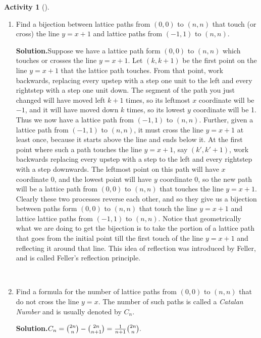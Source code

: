 \documentclass[10pt,]{book}
\theoremstyle{plain}
\theoremstyle{definition}
\newtheorem{activity}[project]{Activity}
\numberwithin{equation}{chapter}
\begin{document}
\begin{activity}[]
\begin{enumerate}[label=(\alph*)]
~\par
\item Find a bijection between lattice paths from \((0,0)\) to \((n,n)\) that touch (or cross) the line \(y=x+1\) and lattice paths from \((-1,1)\) to \((n,n)\).%
\par\medskip\noindent%
\textbf{Solution.}\quad Suppose we have a lattice path form \((0,0)\) to \((n,n)\) which touches or crosses the line \(y=x+1\). Let \((k,k+1)\) be the first point on the line \(y=x+1\) that the lattice path touches. From that point, work backwards, replacing every upstep with a step one unit to the left and every rightstep with a step one unit down. The segment of the path you just changed will have moved left \(k+1\) times, so its leftmost \(x\) coordinate will be \(-1\), and it will have moved down \(k\) times, so its lowest \(y\) coordinate will be 1.  Thus we now have a lattice path from \((-1,1)\) to \((n,n)\). Further, given a lattice path from \((-1,1)\) to \((n,n)\), it must cross the line \(y=x+1\) at least once, because it starts above the line and ends below it. At the first point where such a path touches the line \(y=x+1\), say \((k',k'+1)\), work backwards replacing every upstep with a step to the left and every rightstep with a step downwards. The leftmost point on this path will have \(x\) coordinate 0, and the lowest point will have \(y\) coordinate 0, so the new path will be a lattice path from \((0,0)\) to \((n,n)\) that touches the line \(y=x+1\). Clearly these two processes reverse each other, and so they give us a bijection between paths form \((0,0)\) to \((n,n)\) that touch the line \(y=x+1\) and lattice lattice paths from \((-1,1)\) to \((n,n)\). Notice that geometrically what we are doing to get the bijection is to take the portion of a lattice path that goes from the initial point till the first touch of the line \(y=x+1\) and reflecting it around that line. This idea of reflection was introduced by Feller, and is called Feller's reflection principle.%

~\par
\item Find a formula for the number of lattice paths from \((0,0)\) to \((n,n)\) that do not cross the line \(y=x\).  The number of such paths is called a \emph{Catalan Number} and is usually denoted by \(C_n\).%
\par\medskip\noindent%
\textbf{Solution.}\quad \(C_n={2n\choose n} - {2n \choose n+1}={1\over n+1}{2n\choose n}.\)%

\end{enumerate}
\end{activity}
\end{document}
